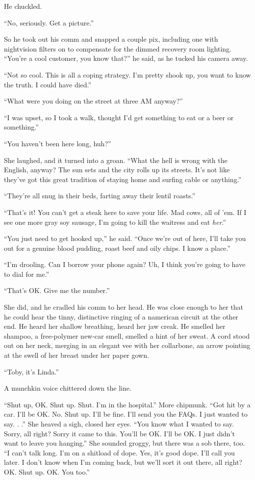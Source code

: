 He chuckled.

“No, seriously. Get a picture.”

So he took out his comm and snapped a couple pix, including one
with nightvision filters on to compensate for the dimmed recovery
room lighting. “You’re a cool customer, you know that?” he said, as
he tucked his camera away.

“Not so cool. This is all a coping strategy. I’m pretty shook up,
you want to know the truth. I could have died.”

“What were you doing on the street at three AM anyway?”

“I was upset, so I took a walk, thought I’d get something to eat or
a beer or something.”

“You haven’t been here long, huh?”

She laughed, and it turned into a groan. “What the hell is wrong
with the English, anyway? The sun sets and the city rolls up its
streets. It’s not like they’ve got this great tradition of staying
home and surfing cable or anything.”

“They’re all snug in their beds, farting away their lentil
roasts.”

“That’s it! You can’t get a steak here to save your life. Mad cows,
all of ’em. If I see one more gray soy sausage, I’m going to kill
the waitress and eat \emph{her}.”

“You just need to get hooked up,” he said. “Once we’re out of here,
I’ll take you out for a genuine blood pudding, roast beef and oily
chips. I know a place.”

“I’m drooling. Can I borrow your phone again? Uh, I think you’re
going to have to dial for me.”

“That’s OK. Give me the number.”

She did, and he cradled his comm to her head. He was close enough
to her that he could hear the tinny, distinctive ringing of a
namerican circuit at the other end. He heard her shallow breathing,
heard her jaw creak. He smelled her shampoo, a free-polymer new-car
smell, smelled a hint of her sweat. A cord stood out on her neck,
merging in an elegant vee with her collarbone, an arrow pointing at
the swell of her breast under her paper gown.

“Toby, it’s Linda.”

A munchkin voice chittered down the line.

“Shut up, OK. Shut up. Shut. I’m in the hospital.” More chipmunk.
“Got hit by a car. I’ll be OK. No. Shut up. I’ll be fine. I’ll send
you the FAQs. I just wanted to say. . .” She heaved a sigh, closed
her eyes. “You know what I wanted to say. Sorry, all right? Sorry
it came to this. You’ll be OK. I’ll be OK. I just didn’t want to
leave you hanging.” She sounded groggy, but there was a sob there,
too. “I can’t talk long. I’m on a shitload of dope. Yes, it’s good
dope. I’ll call you later. I don’t know when I’m coming back, but
we’ll sort it out there, all right? OK. Shut up. OK. You too.”

